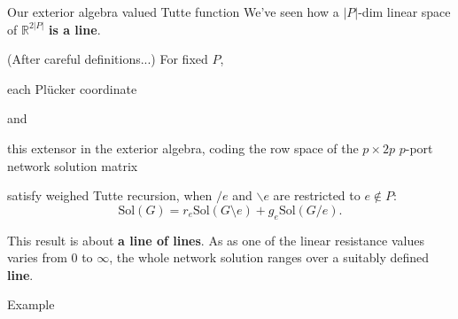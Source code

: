 \documentclass{beamer}
\newcommand{\Reals}{\ensuremath{\mathbb{R}}}
\begin{document}
\begin{frame}{Our exterior algebra valued Tutte function}
We've seen how a $|P|$-dim linear space of $\Reals^{2|P|}$ \textbf{is a line}.

\begin{theorem}
(After careful definitions...) For fixed $P$,\\
\begin{center}
\hfill
\begin{minipage}{0.80in}
each Pl\"{u}cker coordinate
\end{minipage}
\hfill
and
\hfill
\begin{minipage}{1.7in}
this extensor in the exterior algebra, coding the 
row space of the $p \times 2p$ $p$-port network 
solution matrix
\end{minipage}
\hfill
\end{center}
satisfy weighed Tutte recursion, when $/e$ and $\backslash e$
are restricted to $e\not\in P$:
\[
\text{Sol}(G) = r_e \text{Sol}(G\setminus e) + g_e \text{Sol}(G/e).
\]
\end{theorem}

\begin{block}{This result is about \textbf{a line of lines}.}
As as one of the linear resistance values varies from $0$ to $\infty$, 
the whole network solution ranges over a suitably defined \textbf{line}.
\end{block}



\end{frame}




\begin{frame}{Example}

\end{frame}
\end{document}
